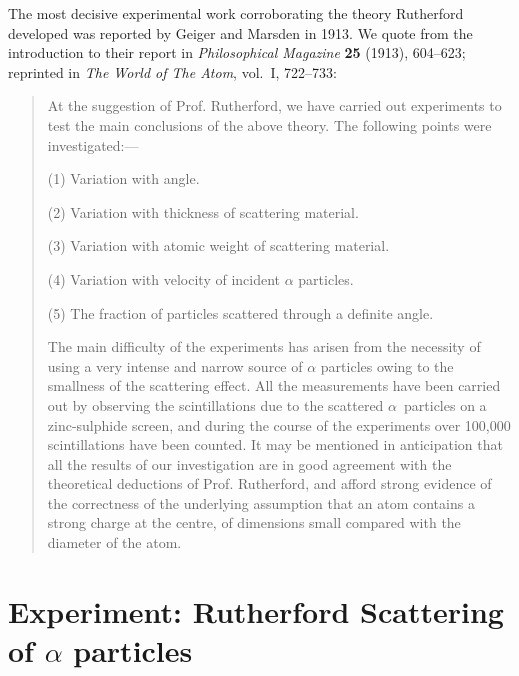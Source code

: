 The most decisive experimental work corroborating the theory Rutherford 
developed was reported by Geiger and Marsden in 1913. We
quote from the introduction to their report in \emph{Philosophical
Magazine} \textbf{25} (1913), 604--623; reprinted in \emph{The World of The
Atom}, vol.\ I, 722--733:

\begin{quote}
At the suggestion of Prof. Rutherford, we have carried out experiments
to test the main conclusions of the above theory. The following points
were investigated:---


(1) Variation with angle.

(2) Variation with thickness of scattering material.

(3) Variation with atomic weight of scattering material.

(4) Variation with velocity of incident $\alpha$ particles.

(5) The fraction of particles scattered through a definite angle.

The main difficulty of the experiments has arisen from the necessity of
using a very intense and narrow source of $\alpha$ particles owing to
the smallness of the scattering effect. All the measurements have been
carried out by observing the scintillations due to the scattered
$\alpha$~particles on a zinc-sulphide screen, and during the course of
the experiments over 100,000 scintillations have been counted. It may be
mentioned in anticipation that all the results of our investigation are
in good agreement with the theoretical deductions of Prof. Rutherford,
and afford strong evidence of the correctness of the underlying
assumption that an atom contains a strong charge at the centre, of
dimensions small compared with the diameter of the atom.
\end{quote}

\section*{Experiment: Rutherford Scattering of $\alpha$ particles}

